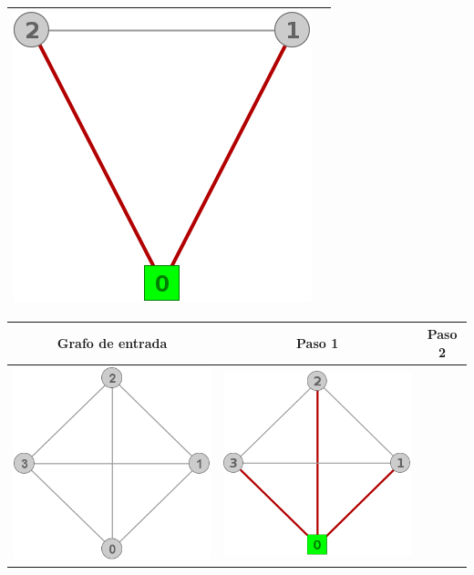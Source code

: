 \begin{center}
\begin{tabular}{ |c||c| }
			\includegraphics[scale = 0.3]{img/ej3/constructiva_golosa/K3_st1.png} \\
			\hline
		\end{tabular}
		\begin{tabular}{ |c||c||c| }
			\hline
			Grafo de entrada & Paso 1 & Paso 2 \\
			\hline\hline
			\includegraphics[scale = 0.3]{img/ej3/constructiva_golosa/K4_st0.png} &
			\includegraphics[scale = 0.3]{img/ej3/constructiva_golosa/K4_st1.png} &

\end{tabular}
\end{center}
